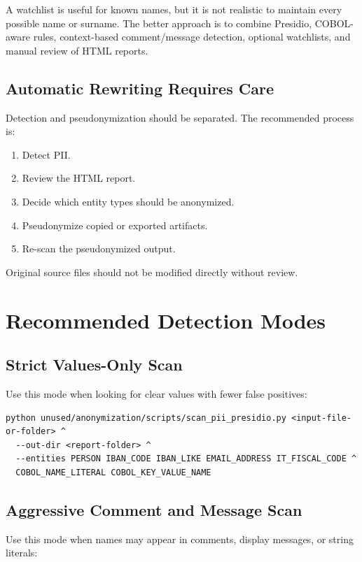 ﻿\documentclass[11pt,a4paper]{article}
\begin{document}
A watchlist is useful for known names, but it is not realistic to maintain every possible name or surname. The better approach is to combine Presidio, COBOL-aware rules, context-based comment/message detection, optional watchlists, and manual review of HTML reports.

\subsection{Automatic Rewriting Requires Care}

Detection and pseudonymization should be separated. The recommended process is:

\begin{enumerate}
  \item Detect PII.
  \item Review the HTML report.
  \item Decide which entity types should be anonymized.
  \item Pseudonymize copied or exported artifacts.
  \item Re-scan the pseudonymized output.
\end{enumerate}

Original source files should not be modified directly without review.

\section{Recommended Detection Modes}

\subsection{Strict Values-Only Scan}

Use this mode when looking for clear values with fewer false positives:

\begin{verbatim}
python unused/anonymization/scripts/scan_pii_presidio.py <input-file-or-folder> ^
  --out-dir <report-folder> ^
  --entities PERSON IBAN_CODE IBAN_LIKE EMAIL_ADDRESS IT_FISCAL_CODE ^
  COBOL_NAME_LITERAL COBOL_KEY_VALUE_NAME
\end{verbatim}

\subsection{Aggressive Comment and Message Scan}

Use this mode when names may appear in comments, display messages, or string literals:
\end{document}
